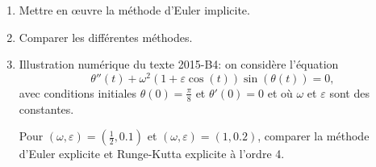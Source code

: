 \documentclass[12pt]{article}
\begin{document}
\begin{exo}
\begin{enumerate}
\item Mettre en \oe uvre la m\'ethode d'Euler implicite.
\item Comparer les différentes méthodes.
\item Illustration numérique du texte 2015-B4: on considère l’équation 
$$
\theta''(t)+\omega^2 (1+\varepsilon \cos(t)) \sin(\theta(t))=0,
$$
avec conditions initiales $\theta(0) = \frac{\pi}{8}$ et $\theta'(0)=0$ et où $\omega$ et $\varepsilon$ sont des constantes.

Pour $(\omega,\varepsilon) = (\frac{1}{2},0.1)$ et $(\omega,\varepsilon) = (1,0.2)$, comparer la méthode d’Euler explicite et Runge-Kutta explicite à l’ordre 4.
\end{enumerate}
\end{exo}
\end{document}
